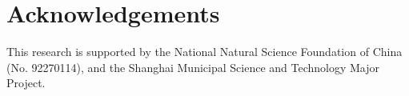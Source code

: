 \documentclass{article}
\theoremstyle{plain}
\newtheorem{theorem}{Theorem}[section]
\newtheorem{proposition}[theorem]{Proposition}
\newtheorem{lemma}[theorem]{Lemma}
\newtheorem{corollary}[theorem]{Corollary}
\theoremstyle{definition}
\newtheorem{definition}[theorem]{Definition}
\newtheorem{assumption}[theorem]{Assumption}
\theoremstyle{remark}
\newtheorem{remark}[theorem]{Remark}
\begin{document}


\section*{Acknowledgements}

This research is supported by the National Natural Science Foundation of China (No. 92270114), and the Shanghai Municipal Science and Technology Major Project.
\end{document}
